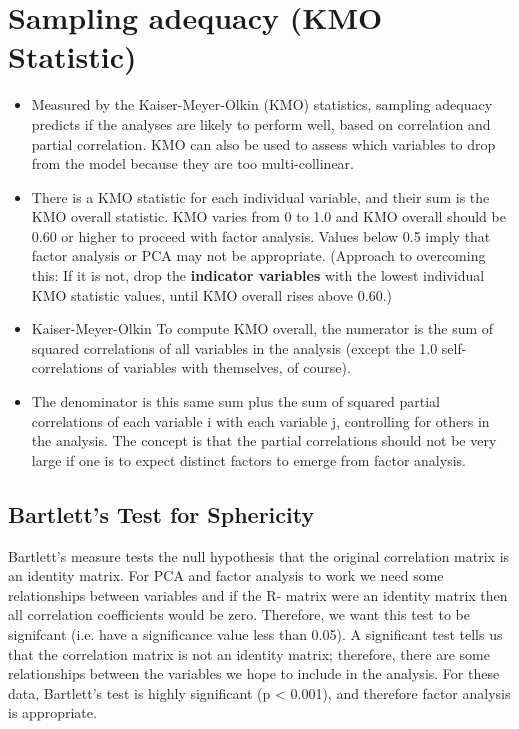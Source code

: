 \documentclass[]{article}
\begin{document}
\section{Sampling adequacy (KMO Statistic)}
\begin{itemize}
\item	
Measured by the Kaiser-Meyer-Olkin (KMO) statistics, sampling adequacy predicts if the analyses are likely to perform well, based on correlation and partial correlation. KMO can also be used to assess which variables to drop from the model because they are too multi-collinear.
\item
There is a KMO statistic for each individual variable, and their sum is the KMO overall statistic. KMO varies from 0 to 1.0 and KMO overall should be 0.60 or higher to proceed with factor analysis. Values below 0.5 imply that factor analysis or PCA may not be appropriate. (Approach to overcoming this: If it is not, drop the \textbf{indicator variables} with the lowest individual KMO statistic values, until KMO overall rises above 0.60.)
\item
Kaiser-Meyer-Olkin
To compute KMO overall, the numerator is the sum of squared correlations of all variables in the analysis (except the 1.0 self-correlations of variables with themselves, of course). 
\item The denominator is this same sum plus the sum of squared partial correlations of each variable i with each variable j, controlling for others in the analysis. The concept is that the partial correlations should not be very large if one is to expect distinct factors to emerge from factor analysis.
\end{itemize}
\subsection{Bartlett's Test for Sphericity}
Bartlett's measure tests the null hypothesis that the original correlation matrix is an identity
matrix. For PCA and factor analysis to work we need some relationships between variables and if the R-
matrix were an identity matrix then all correlation coefficients would be zero. Therefore, we
want this test to be signifcant (i.e. have a significance value less than 0.05). A significant test
tells us that the correlation matrix is not an identity matrix; therefore, there are some relationships
between the variables we hope to include in the analysis. For these data, Bartlett's test is
highly significant (p < 0.001), and therefore factor analysis is appropriate.
\end{document}
